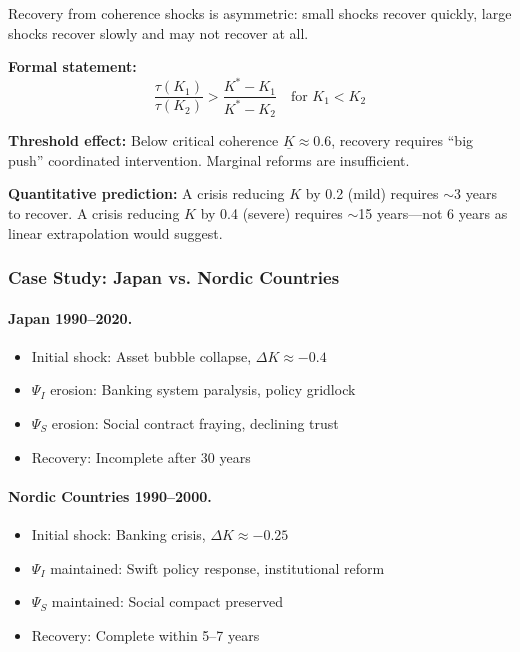\begin{tcolorbox}[colback=blue!5!white, colframe=blue!75!black, title=Prediction 3: Asymmetric Recovery]
Recovery from coherence shocks is asymmetric: small shocks recover quickly, 
large shocks recover slowly and may not recover at all.

\textbf{Formal statement:}
\begin{equation}
\frac{\tau(K_1)}{\tau(K_2)} > \frac{K^* - K_1}{K^* - K_2} \quad \text{for } K_1 < K_2
\end{equation}

\textbf{Threshold effect:} Below critical coherence $\underline{K} \approx 0.6$, 
recovery requires ``big push'' coordinated intervention. Marginal reforms 
are insufficient.

\textbf{Quantitative prediction:} A crisis reducing $K$ by 0.2 (mild) requires 
$\sim$3 years to recover. A crisis reducing $K$ by 0.4 (severe) requires 
$\sim$15 years---not 6 years as linear extrapolation would suggest.
\end{tcolorbox}

\subsubsection{Case Study: Japan vs. Nordic Countries}

\paragraph{Japan 1990--2020.}
\begin{itemize}
  \item Initial shock: Asset bubble collapse, $\Delta K \approx -0.4$
  \item $\Psi_I$ erosion: Banking system paralysis, policy gridlock
  \item $\Psi_S$ erosion: Social contract fraying, declining trust
  \item Recovery: Incomplete after 30 years
\end{itemize}

\paragraph{Nordic Countries 1990--2000.}
\begin{itemize}
  \item Initial shock: Banking crisis, $\Delta K \approx -0.25$
  \item $\Psi_I$ maintained: Swift policy response, institutional reform
  \item $\Psi_S$ maintained: Social compact preserved
  \item Recovery: Complete within 5--7 years
\end{itemize}

